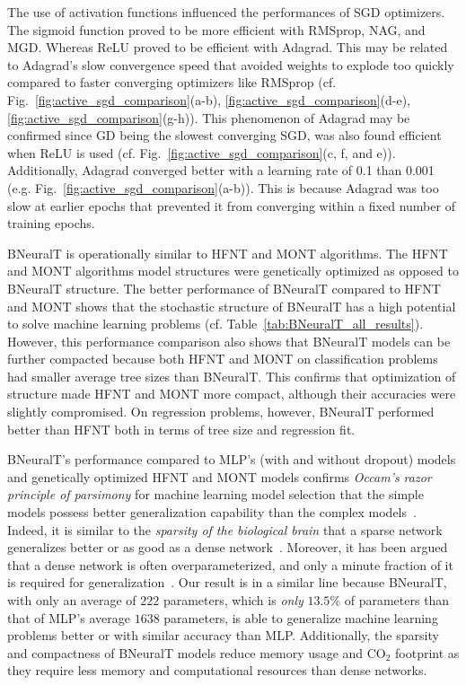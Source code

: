 \documentclass[11pt,a4paper]{article}
\begin{document}
    The use of activation functions influenced the performances of SGD optimizers. The sigmoid function proved to be more efficient with RMSprop, NAG, and MGD.  Whereas ReLU proved to be efficient with Adagrad. This  may be related to Adagrad's slow convergence speed that avoided weights to explode too quickly compared to faster converging optimizers like RMSprop (cf. Fig.~\ref{fig:active_sgd_comparison}(a-b), \ref{fig:active_sgd_comparison}(d-e), \ref{fig:active_sgd_comparison}(g-h)). This phenomenon of Adagrad may be confirmed since GD being the slowest converging SGD, was also found efficient when ReLU is used (cf. Fig.~\ref{fig:active_sgd_comparison}(c, f, and e)).
    Additionally, Adagrad converged better with a learning rate of 0.1 than 0.001 (e.g.  Fig.~\ref{fig:active_sgd_comparison}(a-b)). This is because Adagrad was too slow at earlier epochs that prevented it from converging within a fixed number of training epochs. 
    
    BNeuralT is operationally similar to HFNT and MONT algorithms. The HFNT and MONT algorithms model structures were genetically optimized  as opposed to BNeuralT structure. The better performance of BNeuralT compared to HFNT and MONT shows that the stochastic structure of BNeuralT has a high potential to solve machine learning problems (cf. Table~\ref{tab:BNeuralT_all_results}). However, this performance comparison also shows that BNeuralT models can be further compacted because both HFNT and MONT on classification problems had smaller average tree sizes than BNeuralT. This confirms that optimization of structure made HFNT and MONT more compact, although their accuracies were slightly compromised. On regression problems, however, BNeuralT performed better than HFNT both in terms of tree size and regression fit.  
    
    BNeuralT's performance compared to MLP's (with and without dropout) models and genetically optimized HFNT and MONT models confirms \textit{Occam's razor principle of parsimony} for machine learning model selection that the simple models possess better generalization capability than the complex models~\citep{blumer1987occam}. Indeed, it is similar to the \textit{sparsity of the biological brain} that a sparse network generalizes better or as good as a dense network~\citep{friston2008hierarchical,herculano2010connectivity,hoefler2021sparsity}. Moreover, it has been argued that a dense network is often overparameterized, and only a minute fraction of it is required for generalization~\citep{denil2013predicting}. Our result is in a similar line because BNeuralT, with only an average of $222$ parameters, which is \textit{only} $13.5\%$ of parameters than that of MLP's average $1638$ parameters, is able to generalize machine learning problems better or with similar accuracy than MLP. Additionally, the sparsity and compactness of BNeuralT models reduce memory usage and CO$_2$ footprint as they require less memory and computational resources than dense networks.
    
\end{document}
